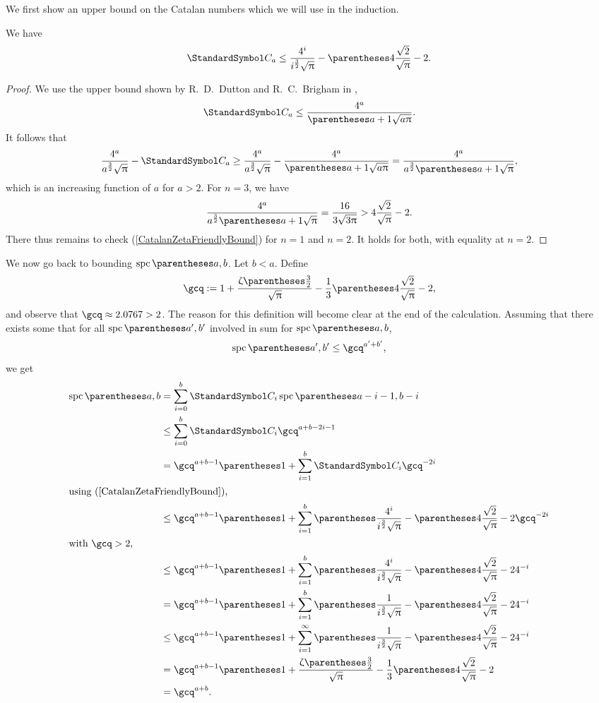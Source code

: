 We first show an upper bound on the Catalan numbers which we will use in the induction.
\begin{remark}
We have\begin{equation}
\CatalanNumber a \leq \frac{4^i}{i^{\frac 3 2}\sqrt{\Pi}}-\pa{4\frac {\sqrt 2} {\sqrt \Pi}-2} \text.\label{CatalanZetaFriendlyBound}
\end{equation}
\begin{proof}
We use the upper bound shown by R.~D.~Dutton and R.~C.~Brigham in \cite{DuttonBrigham1986},\[
\CatalanNumber a\leq \frac{4^a}{\pa{a+1}\sqrt{a\Pi}}\text.
\]
It follows that\[
\frac{4^a}{a^{\frac 3 2}\sqrt{\Pi}} - \CatalanNumber a \geq \frac{4^a}{a^{\frac 3 2}\sqrt{\Pi}} - \frac{4^a}{\pa{a+1}\sqrt{a\Pi}} = \frac{4^a}{a^{\frac 3 2}\pa{a+1}\sqrt{\Pi}}\text,
\]
which is an increasing function of $a$ for $a>2$. For $n=3$, we have\[
\frac{4^a}{a^{\frac 3 2}\pa{a+1}\sqrt{\Pi}}=\frac{16}{3\sqrt{3\Pi}}>4\frac {\sqrt 2} {\sqrt \Pi}-2\text.
\]
There thus remains to check (\ref{CatalanZetaFriendlyBound}) for $n=1$ and $n=2$. It holds for both, with equality at $n=2$.
\end{proof}
\end{remark}
We now go back to bounding $\spc\of{a,b}$.
Let $b<a$. Define\[
\gcq\DefineAs 1+\frac{\RiemannZeta\of{\frac 3 2}}{\sqrt{\Pi}}-\frac{1}{3}\pa{4\frac {\sqrt 2} {\sqrt \Pi}-2}\text,
\]
and observe that $\gcq\approx 2.0767 > 2$. The reason for this definition will become clear at the end of the calculation.
Assuming that there exists some that for all $\spc\of{a',b'}$ involved in sum
for $\spc\of{a,b}$,\[
\spc\of{a',b'}\leq\gcq^{a'+b'}\text,
\]
we get\begin{align*}
\spc\of{a,b} &= \sum{i=0}[b] \CatalanNumber {i} \spc\of{a-i-1,b-i} \\
 &\leq \sum{i=0}[b] \CatalanNumber {i} \gcq^{a+b-2i-1} \\
 &= \gcq^{a+b-1}\pa{1+\sum{i=1}[b] \CatalanNumber {i} \gcq^{-2i}}\\
\intertext{using (\ref{CatalanZetaFriendlyBound}),}
 &\leq \gcq^{a+b-1}\pa{1+\sum{i=1}[b] \pa{\frac{4^i}{i^{\frac 3 2}\sqrt{\Pi}}-\pa{4\frac {\sqrt 2} {\sqrt \Pi}-2}} \gcq^{-2i}} \\
\intertext{with $\gcq > 2$,}
 &\leq \gcq^{a+b-1}\pa{1+\sum{i=1}[b] \pa{\frac{4^i}{i^{\frac 3 2}\sqrt{\Pi}}-\pa{4\frac {\sqrt 2} {\sqrt \Pi}-2}} 4^{-i}} \\
 &= \gcq^{a+b-1}\pa{1+\sum{i=1}[b] \pa{\frac{1}{i^{\frac 3 2}\sqrt{\Pi}}-\pa{4\frac {\sqrt 2} {\sqrt \Pi}-2} 4^{-i}}} \\
 &\leq \gcq^{a+b-1}\pa{1+\sum{i=1}[\infty] \pa{\frac{1}{i^{\frac 3 2}\sqrt{\Pi}}-\pa{4\frac {\sqrt 2} {\sqrt \Pi}-2} 4^{-i}}} \\
 &= \gcq^{a+b-1}\pa{1+\frac{\RiemannZeta\of{\frac 3 2}}{\sqrt{\Pi}}-\frac{1}{3}\pa{4\frac {\sqrt 2} {\sqrt \Pi}-2}} \\
 &= \gcq^{a+b}\text.
\end{align*}
